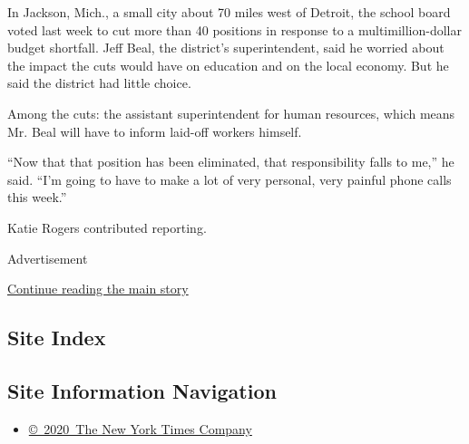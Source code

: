 In Jackson, Mich., a small city about 70 miles west of Detroit, the
school board voted last week to cut more than 40 positions in response
to a multimillion-dollar budget shortfall. Jeff Beal, the district's
superintendent, said he worried about the impact the cuts would have on
education and on the local economy. But he said the district had little
choice.

Among the cuts: the assistant superintendent for human resources, which
means Mr. Beal will have to inform laid-off workers himself.

``Now that that position has been eliminated, that responsibility falls
to me,'' he said. ``I'm going to have to make a lot of very personal,
very painful phone calls this week.''

Katie Rogers contributed reporting.

Advertisement

\protect\hyperlink{after-bottom}{Continue reading the main story}

\hypertarget{site-index}{%
\subsection{Site Index}\label{site-index}}

\hypertarget{site-information-navigation}{%
\subsection{Site Information
Navigation}\label{site-information-navigation}}

\begin{itemize}
\tightlist
\item
  \href{https://help.nytimes3xbfgragh.onion/hc/en-us/articles/115014792127-Copyright-notice}{©~2020~The
  New York Times Company}
\end{itemize}

